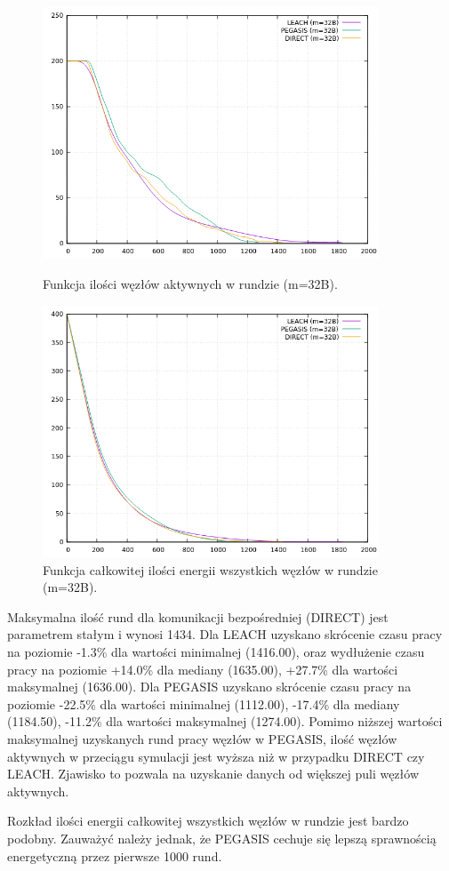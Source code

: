 \documentclass[a4paper,12pt,twoside,openany]{report}
\begin{document}
\begin{figure}[H]
 \centering
 \includegraphics[width=10cm]{images/gnuplot/test_1/nodes_in_round_m32.png}
 \caption{Funkcja ilości węzłów aktywnych w rundzie (m=32B).}
 \includegraphics[width=10cm]{images/gnuplot/test_1/energy_in_round_m32.png}
 \caption{Funkcja całkowitej ilości energii wszystkich węzłów w rundzie (m=32B).}
\end{figure}

\par
Maksymalna ilość rund dla komunikacji bezpośredniej (DIRECT) jest parametrem stałym i wynosi 1434.
Dla LEACH uzyskano skrócenie czasu pracy na poziomie -1.3\% dla wartości minimalnej (1416.00), oraz wydłużenie czasu pracy na poziomie +14.0\% dla mediany (1635.00), +27.7\% dla wartości maksymalnej (1636.00).
Dla PEGASIS uzyskano skrócenie czasu pracy na poziomie -22.5\% dla wartości minimalnej (1112.00), -17.4\% dla mediany (1184.50), -11.2\% dla wartości maksymalnej (1274.00).
Pomimo niższej wartości maksymalnej uzyskanych rund pracy węzłów w PEGASIS, ilość węzłów aktywnych w przeciągu symulacji jest wyższa niż w przypadku DIRECT czy LEACH.
Zjawisko to pozwala na uzyskanie danych od większej puli węzłów aktywnych.
\par 
Rozkład ilości energii całkowitej wszystkich węzłów w rundzie jest bardzo podobny.
Zauważyć należy jednak, że PEGASIS cechuje się lepszą sprawnością energetyczną przez pierwsze 1000 rund.
\end{document}

